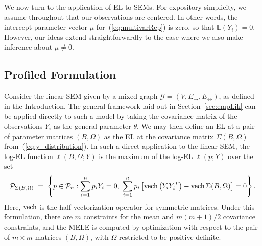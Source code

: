 \documentclass[notitlepage]{article}
\newcommand{\ve}{{\rm vech}}       %
\begin{document}
We now turn to the application of EL to SEMs.  For expository
simplicity, we assume throughout that our observations are centered.
In other words, the intercept parameter vector $\mu$
for~(\ref{eq:multivarRep}) is zero, so that $\mathbb{E}(Y_i)=0$.
However, our ideas extend straightforwardly to the case where we also
make inference about $\mu \neq 0$.

\subsection{Profiled Formulation}

Consider the linear SEM given by a mixed graph
$\mathcal{G}=(V,E_\rightarrow,E_\leftrightarrow)$, as defined in the
Introduction.  The general framework laid out in
Section~\ref{sec:empLik} can be applied directly to such a model by
taking the covariance matrix of the observations $Y_i$ as the general
parameter $\theta$.  We may then define an EL at a pair of parameter
matrices $(B,\Omega)$ as the EL at the covariance matrix
$\Sigma(B,\Omega)$ from~(\ref{eq:y_distribution}).  In such a direct
application to the linear SEM, the log-EL function
$\ell( B, \Omega; Y)$ is the maximum of the log-EL $\ell(p; Y)$ over
the set
\begin{equation}\label{eq:naive}
\begin{aligned}
&\mathcal{P}_{\Sigma(B,\Omega)} \;=\;\left\{p\in\mathcal{P}_n:  \sum_{i=1}^n
  p_i Y_i  = 0, \; \sum_{i=1}^n p_i\left[\ve\left(Y_iY_i^T\right) - \ve\, \Sigma(B, \Omega)\right] = 0\right\}. \\
\end{aligned}
\end{equation}
Here, $\ve$ is the half-vectorization operator for symmetric
matrices. Under this formulation, there are $m$ constraints for the
mean and $m(m + 1)/2$ covariance constraints, and the MELE is computed
by optimization with respect to the pair of $m\times m$ matrices
$(B,\Omega)$, with $\Omega$ restricted to be positive definite.
\end{document}
